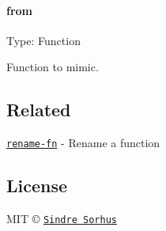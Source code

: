 \paragraph*{from}

Type\+: {\ttfamily Function}

Function to mimic.

\subsection*{Related}


\begin{DoxyItemize}
\item \href{https://github.com/sindresorhus/rename-fn}{\tt rename-\/fn} -\/ Rename a function
\end{DoxyItemize}

\subsection*{License}

M\+IT © \href{https://sindresorhus.com}{\tt Sindre Sorhus} 